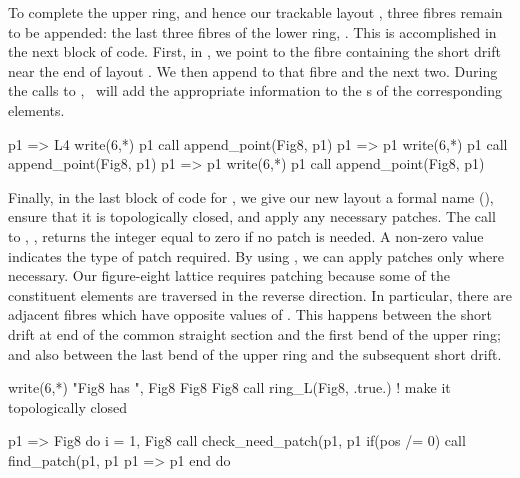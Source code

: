 %
To complete the upper ring, and hence our trackable layout
, three fibres remain to be appended: the last three
fibres of the lower ring, . This is accomplished in the
next block of code. First, in , we point
 to the fibre containing the short drift near the end of
layout . We then append to  that fibre and the
next two. During the calls to , \PTC\ will add
the appropriate information to the s of the corresponding
elements.
%
\begin{ptccode}
p1 => L4%
write(6,*) p1%
call append_point(Fig8, p1)
p1 => p1%
write(6,*) p1%
call append_point(Fig8, p1)
p1 => p1%
write(6,*) p1%
call append_point(Fig8, p1)
\end{ptccode}

%
Finally, in the last block of code for , we give our new
layout a formal name (), ensure that it is
topologically closed, and apply any necessary patches. The call to
, , returns the integer
 equal to zero if no patch is needed. A non-zero value
indicates the type of patch required. By using ,
we can apply patches only where necessary. Our figure-eight lattice
requires patching because some of the constituent elements are
traversed in the reverse direction. In particular, there are adjacent
fibres  which have opposite values of . This
happens between the short drift at end of the common straight section
and the first bend of the upper ring; and also between the last bend
of the upper ring and the subsequent short drift.
%
\begin{ptccode}
write(6,*) "Fig8 has ", Fig8%
Fig8%
Fig8%
call ring_L(Fig8, .true.) ! make it topologically closed

p1 => Fig8%
do i = 1, Fig8%
  call check_need_patch(p1, p1%
  if(pos /= 0) call find_patch(p1, p1%
  p1 => p1%
end do
\end{ptccode}

